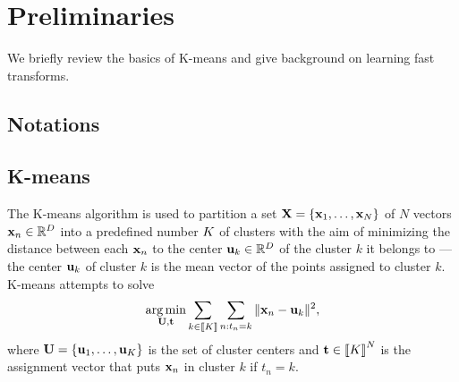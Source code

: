\section{Preliminaries}
\label{sec:background}
We briefly review the basics of K-means and
 give background on learning fast transforms.

\subsection{Notations}








\subsection{K-means}
\label{sec:kmeans}
The K-means algorithm is used to partition a set ${\mathbf{X}}=\{{\mathbf{x}}_1,\ldots,{\mathbf{x}}_N\}$ of $N$  vectors ${\mathbf{x}}_n\in\mathbb{R}^{D}$ into a predefined number $K$ of clusters
with the aim of minimizing the distance between each ${\mathbf{x}}_n$ to the center ${\mathbf{u}}_k\in\mathbb{R}^{D}$
of the cluster $k$ it belongs to ---the center ${\mathbf{u}}_k$ of cluster $k$ is the
 mean vector of the points assigned to cluster $k$.
K-means attempts to solve
\begin{equation}
\label{eq:kmean_problem}
    \operatorname*{arg\,min}_{{\mathbf{U}}, {\mathbf{t}}} \sum_{k\in\left \llbracket K\right \rrbracket} \sum_{n: t_n = k} \|{\mathbf{x}}_{n} -{\mathbf{u}}_{k}\|^2,
\end{equation}
where ${\mathbf{U}}=\{{\mathbf{u}}_1,\ldots,{\mathbf{u}}_K\}$ is the set of cluster centers and ${\mathbf{t}} \in  \left \llbracket K\right \rrbracket^{N}$ is the assignment vector that puts ${\mathbf{x}}_n$ in cluster $k$
if $t_n=k$.


